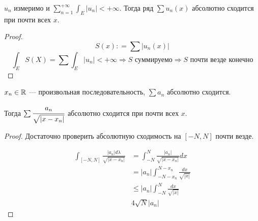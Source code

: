 \begin{corollary}
    \(u_n\) измеримо и
    \(\sum\limits_{n = 1}^{+\infty} \int_E |u_n| < +\infty\). Тогда ряд \(\sum u_n(x)\) абсолютно сходится при почти всех \(x\).
\end{corollary}
\begin{proof}
    \[S(x) : = \sum |u_n(x)|\]
    \[\int_E S(X) = \sum \int_E |u_n|< +\infty \Rightarrow S \text{ суммируемо} \Rightarrow S \text{ почти везде конечно}\]
\end{proof}

\begin{example}
    \(x_n\in\mathbb{R}\) --- произвольная последовательность, \(\sum a_n\) абсолютно сходится.

    Тогда \(\sum \cfrac{a_n}{\sqrt{|x - x_n|}}\) абсолютно сходится при почти всех \(x\).
\end{example}
\begin{proof}
    Достаточно проверить абсолютную сходимость на \([ - N, N]\) почти везде.

    \begin{align*}
        \int_{[ - N, N]} \frac{|a_n| d\lambda}{\sqrt{|x - x_n|}}
         & = \int_{ - N}^N \frac{|a_n|}{\sqrt{|x - x_n|}} dx        \\
         & = |a_n|\int_{ - N - x_n}^{N - x_n} \frac{dx}{\sqrt{|x|}} \\
         & \leq |a_n|\int_{ - N}^{N} \frac{dx}{\sqrt{|x|}}          \\
         & 4 \sqrt{N} |a_n|
    \end{align*}
\end{proof}

